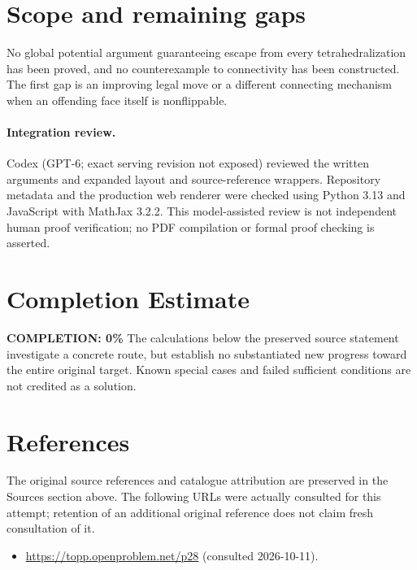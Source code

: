\documentclass[11pt,a4paper]{article}
\begin{document}
\section{Scope and remaining gaps}
No global potential argument guaranteeing escape from every tetrahedralization
has been proved, and no counterexample to connectivity has been constructed.
The first gap is an improving legal move or a different connecting mechanism
when an offending face itself is nonflippable.
\paragraph{Integration review.} Codex (GPT-6; exact serving revision not exposed) reviewed the written arguments and expanded layout and source-reference wrappers. Repository metadata and the production web renderer were checked using Python 3.13 and JavaScript with MathJax 3.2.2. This model-assisted review is not independent human proof verification; no PDF compilation or formal proof checking is asserted.

\section{Completion Estimate}
\noindent\textbf{COMPLETION: 0\%}
The calculations below the preserved source statement investigate a concrete route,
but establish no substantiated new progress toward the entire original target.
Known special cases and failed sufficient conditions are not credited as a solution.
\section{References}
The original source references and catalogue attribution are preserved in the
Sources section above. The following URLs were actually consulted for this attempt;
retention of an additional original reference does not claim fresh consultation of it.
\begin{itemize}
\item \url{https://topp.openproblem.net/p28} (consulted 2026-10-11). 
\end{itemize}
\end{document}
